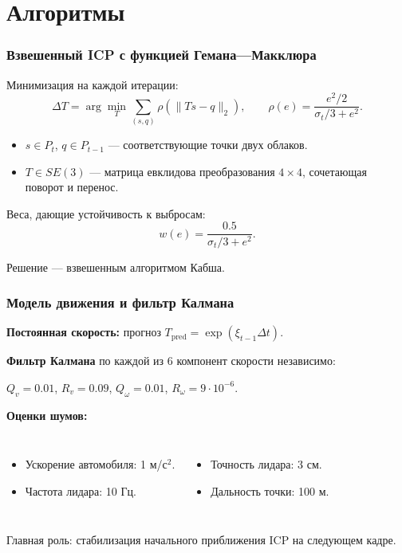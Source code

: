 \documentclass[pdf, hyperref={unicode}, aspectratio=169]{beamer}
\begin{document}
\section{Алгоритмы}
\begin{frame}
	\frametitle{Взвешенный ICP с функцией Гемана---Макклюра}

	Минимизация на каждой итерации:
	\begin{equation*}
		\Delta T = \arg\min_T \sum_{(s,q)} \rho(\|Ts - q\|_2),
		\qquad
		\rho(e) = \frac{e^2/2}{\sigma_t/3 + e^2}.
	\end{equation*}

	\begin{itemize}
		\fontsize{9pt}{11pt}\selectfont
		\item $s \in P_t$, $q \in P_{t-1}$ --- соответствующие точки двух облаков.
		\item $T \in SE(3)$ --- матрица евклидова преобразования $4\times4$, сочетающая поворот и перенос.
	\end{itemize}

	Веса, дающие устойчивость к выбросам:
	\begin{equation*}
		w(e) = \frac{0.5}{\sigma_t/3 + e^2}.
	\end{equation*}

	Решение --- взвешенным алгоритмом Кабша.
\end{frame}


\begin{frame}
	\frametitle{Модель движения и фильтр Калмана}

	\textbf{Постоянная скорость:} прогноз $T_{\mathrm{pred}} = \exp(\xi_{t-1}\Delta t)$.

	\textbf{Фильтр Калмана} по каждой из 6 компонент скорости независимо:
	\begin{center}
		\fontsize{11pt}{13pt}\selectfont
		$Q_v = 0.01$, $R_v = 0.09$, $Q_\omega = 0.01$, $R_\omega = 9\cdot10^{-6}$.
	\end{center}

	\textbf{Оценки шумов:}
	\vspace{-0.4em}
	\begin{columns}[T]
		\begin{itemize}
			\item Ускорение автомобиля: 1 м/с$^2$.
			\item Частота лидара: 10 Гц.
		\end{itemize}
		\begin{itemize}
			\item Точность лидара: 3 см.
			\item Дальность точки: 100 м.
		\end{itemize}
	\end{columns}

	\vfill
	Главная роль: стабилизация начального приближения ICP на следующем кадре.
\end{frame}
\end{document}
